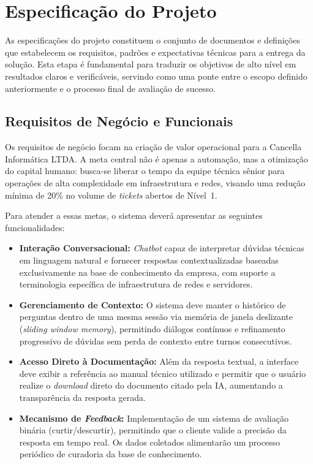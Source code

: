 \documentclass[a4paper,12pt,Times]{article}
\begin{document}
\section{Especificação do Projeto}

As especificações do projeto constituem o conjunto de documentos e definições que
estabelecem os requisitos, padrões e expectativas técnicas para a entrega da solução.
Esta etapa é fundamental para traduzir os objetivos de alto nível em resultados claros e
verificáveis, servindo como uma ponte entre o escopo definido anteriormente e o processo
final de avaliação de sucesso.

\subsection{Requisitos de Negócio e Funcionais}

Os requisitos de negócio focam na criação de valor operacional para a Cancella Informática
LTDA\@. A meta central não é apenas a automação, mas a otimização do capital humano:
busca-se liberar o tempo da equipe técnica sênior para operações de alta complexidade em
infraestrutura e redes, visando uma redução mínima de 20\% no volume de \textit{tickets}
abertos de Nível~1.

Para atender a essas metas, o sistema deverá apresentar as seguintes funcionalidades:

\begin{itemize}
    \item \textbf{Interação Conversacional:} \textit{Chatbot} capaz de interpretar dúvidas
          técnicas em linguagem natural e fornecer respostas contextualizadas baseadas
          exclusivamente na base de conhecimento da empresa, com suporte a terminologia
          específica de infraestrutura de redes e servidores.
    \item \textbf{Gerenciamento de Contexto:} O sistema deve manter o histórico de perguntas
          dentro de uma mesma sessão via memória de janela deslizante (\textit{sliding window
          memory}), permitindo diálogos contínuos e refinamento progressivo de dúvidas sem
          perda de contexto entre turnos consecutivos.
    \item \textbf{Acesso Direto à Documentação:} Além da resposta textual, a interface deve
          exibir a referência ao manual técnico utilizado e permitir que o usuário realize o
          \textit{download} direto do documento citado pela IA, aumentando a transparência
          da resposta gerada.
    \item \textbf{Mecanismo de \textit{Feedback}:} Implementação de um sistema de avaliação
          binária (curtir/descurtir), permitindo que o cliente valide a precisão da resposta
          em tempo real. Os dados coletados alimentarão um processo periódico de curadoria
          da base de conhecimento.
\end{itemize}
\end{document}
